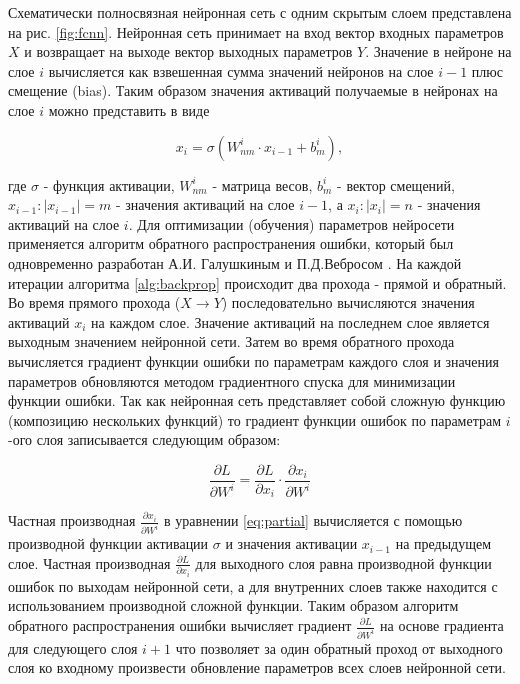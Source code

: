 Схематически полносвязная нейронная сеть с одним скрытым слоем представлена на рис. \ref{fig:fcnn}. Нейронная сеть принимает на вход вектор входных параметров $X$ и возвращает на выходе вектор выходных параметров $Y$. Значение в нейроне на слое $i$ вычисляется как взвешенная сумма значений нейронов на слое $i - 1$ плюс смещение (bias). Таким образом значения активаций получаемые в нейронах на слое $i$ можно представить в виде 

\begin{equation}
    x_i = \sigma(W^i_{nm} \cdot x_{i - 1} + b^i_m),
\label{eq:lin_layer}
\end{equation}

где $\sigma$ - функция активации, $W^i_{nm}$ - матрица весов, $b^i_m$ - вектор смещений, $x_{i - 1}: |x_{i - 1}| = m$ - значения активаций на слое $i - 1$, а $x_{i}: |x_{i}| = n$ - значения активаций на слое $i$. Для оптимизации (обучения) параметров нейросети применяется алгоритм обратного распространения ошибки, который был одновременно разработан А.И. Галушкиным \cite{Galushkin} и П.Д.Вебросом \cite{webros_1974}. На каждой итерации алгоритма \ref{alg:backprop} происходит два прохода - прямой и обратный. Во время прямого прохода ($X \to Y$) последовательно вычисляются значения активаций $x_i$ на каждом слое. Значение активаций на последнем слое является выходным значением нейронной сети. Затем во время обратного прохода вычисляется градиент функции ошибки по параметрам каждого слоя и значения параметров обновляются методом градиентного спуска для минимизации функции ошибки. Так как нейронная сеть представляет собой сложную функцию (композицию нескольких функций) то градиент функции ошибок по параметрам $i$-ого слоя записывается следующим образом: 

\begin{equation}
    \frac{\partial L}{\partial W^i} = \frac{\partial L}{\partial x_i} \cdot  \frac{\partial x_i}{\partial W^i}
\label{eq:partial}
\end{equation}

Частная производная $\frac{\partial x_i}{\partial W^i}$ в уравнении \ref{eq:partial} вычисляется с помощью производной функции активации $\sigma$ и значения активации $x_{i-1}$ на предыдущем слое. Частная производная $\frac{\partial L}{\partial x_i}$ для выходного слоя равна производной функции ошибок по выходам нейронной сети, а для внутренних слоев также находится с использованием производной сложной функции. Таким образом алгоритм обратного распространения ошибки вычисляет градиент $\frac{\partial L}{\partial W^i}$ на основе градиента для следующего слоя $i + 1$ что позволяет за один обратный проход от выходного слоя ко входному произвести обновление параметров всех слоев нейронной сети.

